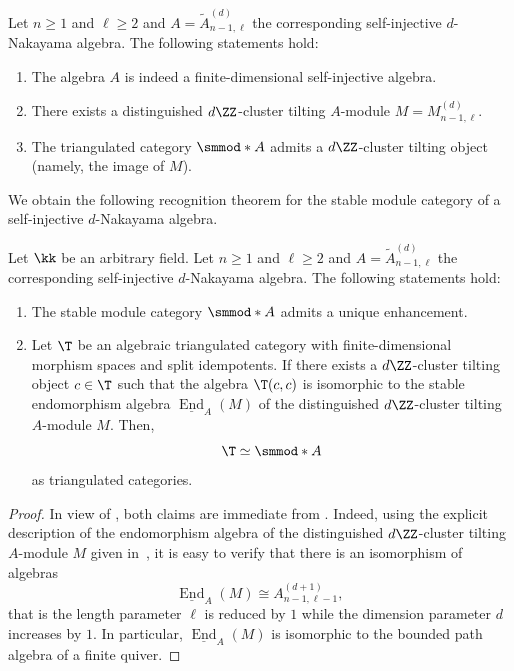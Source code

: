 \documentclass[a4paper]{amsart}
\begin{document}
\begin{theorem}[{\cite[Thm.~4.10]{JK19a}}]
  \label{thm:Nakayama}
  Let $n\geq1$ and $\ell\geq2$ and $A=\widetilde{A}_{n-1,\ell}^{(d)}$ the
  corresponding self-injective $d$-Nakayama algebra. The following statements
  hold:
  \begin{enumerate}
  \item The algebra $A$ is indeed a finite-dimensional self-injective algebra.
  \item There exists a distinguished $d\ZZ$-cluster tilting $A$-module
    $M=M_{n-1,\ell}^{(d)}$.
  \item The triangulated category $\smmod*{A}$ admits a $d\ZZ$-cluster tilting
    object (namely, the image of $M$).
  \end{enumerate}
\end{theorem}

We obtain the following recognition theorem for the stable module category of a
self-injective $d$-Nakayama algebra.

\begin{theorem}
  Let $\kk$ be an arbitrary field. Let $n\geq1$ and $\ell\geq2$ and
  $A=\widetilde{A}_{n-1,\ell}^{(d)}$ the corresponding self-injective
  $d$-Nakayama algebra. The following statements hold:
  \begin{enumerate}
  \item The stable module category $\smmod*{A}$ admits a unique enhancement.
  \item Let $\T$ be an algebraic triangulated category with finite-dimensional
    morphism spaces and split idempotents. If there exists a $d\ZZ$-cluster
    tilting object $c\in\T$ such that the algebra $\T(c,c)$ is isomorphic to the
    stable endomorphism algebra $\underline{\operatorname{End}}_{A}(M)$ of the
    distinguished $d\ZZ$-cluster tilting $A$-module $M$. Then,
    \[
      \T\simeq\smmod*{A}
    \]
    as triangulated categories.
  \end{enumerate}
\end{theorem}
\begin{proof}
  In view of , both claims are immediate from
  .
  Indeed, using the explicit
  description of the endomorphism algebra of the distinguished $d\ZZ$-cluster
  tilting $A$-module $M$ given in~\cite[Def.~4.9]{JK19a}, it is easy to verify
  that there is an isomorphism of algebras
  \[
    \underline{\operatorname{End}}_{A}(M)\cong A_{n-1,\ell-1}^{(d+1)},
  \]
  that is the length parameter $\ell$ is reduced by $1$ while the dimension
  parameter $d$ increases by $1$. In particular,
  $\underline{\operatorname{End}}_{A}(M)$ is isomorphic to the bounded path
  algebra of a finite quiver.
\end{proof}
\end{document}
